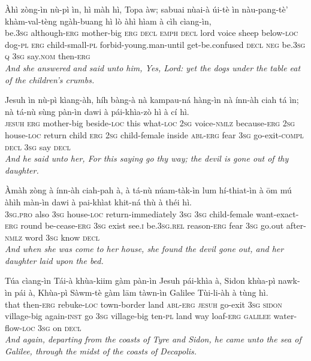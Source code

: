 \documentclass[11pt,a4paper]{article}
\begin{document}
\begin{exe}
\gll Àhì zòng-ìn nù-pì ìn, hì màh hì, Topa àw; sabuai nùai-à úi-tè ìn nàu-pang-tè' khàm-val-tèng ngàh-buang hì lò àhì hìam à cìh cìang-ìn, \\
     be.\textsc{3sg} although-\textsc{erg} mother-big \textsc{erg} \textsc{decl} \textsc{emph} \textsc{decl} lord voice sheep below-\textsc{loc} dog-\textsc{pl} \textsc{erg} child-small-\textsc{pl} forbid-young.man-until get-be.confused \textsc{decl} \textsc{neg} be.\textsc{3sg} \textsc{q} \textsc{3sg} say.\textsc{nom} then-\textsc{erg} \\
\glt \textcolor{kjvcolor}{\textit{And she answered and said unto him, Yes, Lord: yet the dogs under the table eat of the children's crumbs.}}

\gll Jesuh ìn nù-pì kìang-àh, híh bàng-à nà kampau-ná hàng-ìn nà ínn-àh ciah tá ìn; nà tá-nù sùng pàn-ìn dawi à pái-khìa-zò hì à cí hì. \\
     \textsc{jesuh} \textsc{erg} mother-big beside-\textsc{loc} this what-\textsc{loc} \textsc{2sg} voice-\textsc{nmlz} because-\textsc{erg} \textsc{2sg} house-\textsc{loc} return child \textsc{erg} \textsc{2sg} child-female inside \textsc{abl}-\textsc{erg} fear \textsc{3sg} go-exit-\textsc{compl} \textsc{decl} \textsc{3sg} say \textsc{decl} \\
\glt \textcolor{kjvcolor}{\textit{And he said unto her, For this saying go thy way; the devil is gone out of thy daughter.}}

\gll Àmàh zòng à ínn-àh ciah-pah à, à tá-nù núam-tàk-ìn lum hí-thiat-ìn à ōm mú àhìh màn-ìn dawi à pai-khìat khit-ná thù à théi hì. \\
     \textsc{3sg}.\textsc{pro} also \textsc{3sg} house-\textsc{loc} return-immediately \textsc{3sg} \textsc{3sg} child-female want-exact-\textsc{erg} round be-cease-\textsc{erg} \textsc{3sg} exist see.\textsc{i} be.\textsc{3sg}.\textsc{rel} reason-\textsc{erg} fear \textsc{3sg} go.out after-\textsc{nmlz} word \textsc{3sg} know \textsc{decl} \\
\glt \textcolor{kjvcolor}{\textit{And when she was come to her house, she found the devil gone out, and her daughter laid upon the bed.}}

\gll Túa cìang-ìn Tái-à khùa-kiim gàm pàn-ìn Jesuh pái-khìa à, Sidon khùa-pì nawk-ìn pái à, Khùa-pì Sàwm-tè gàm lām tàwn-ìn Galilee Tùi-li-àh à tùng hì. \\
     that then-\textsc{erg} rebuke-\textsc{loc} town-border land \textsc{abl}-\textsc{erg} \textsc{jesuh} go-exit \textsc{3sg} \textsc{sidon} village-big again-\textsc{inst} go \textsc{3sg} village-big ten-\textsc{pl} land way loaf-\textsc{erg} \textsc{galilee} water-flow-\textsc{loc} \textsc{3sg} on \textsc{decl} \\
\glt \textcolor{kjvcolor}{\textit{And again, departing from the coasts of Tyre and Sidon, he came unto the sea of Galilee, through the midst of the coasts of Decapolis.}}


\end{exe}
\end{document}
